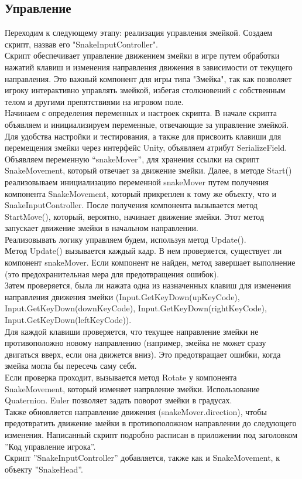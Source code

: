 \subsection{Управление}
Переходим к следующему этапу: реализация управления змейкой. 
Создаем скрипт, назвав его "SnakeInputController". \\
Скрипт обеспечивает управление движением змейки в игре путем обработки нажатий клавиш и изменения направления движения в зависимости от текущего направления. Это важный компонент для игры типа "Змейка", так как позволяет игроку интерактивно управлять змейкой, избегая столкновений с собственным телом и другими препятствиями на игровом поле.\\
Начинаем с определения переменных и настроек скрипта. В начале скрипта объявляем и инициализируем переменные, отвечающие за управление змейкой. Для удобства настройки и тестирования, а также для присвоить клавиши для перемещения змейки через интерфейс Unity, объявляем атрибут SerializeField. Объявляем переменную “snakeMover”, для хранения ссылки на скрипт SnakeMovement, который отвечает за движение змейки.
Далее, в методе Start() реализовываем инициализацию переменной snakeMover путем получения компонента SnakeMovement, который прикреплен к тому же объекту, что и SnakeInputController. После получения компонента вызывается метод StartMove(), который, вероятно, начинает движение змейки. Этот метод запускает движение змейки в начальном направлении.\\
Реализовывать логику управляем будем, используя метод Update(). \\
Метод Update() вызывается каждый кадр. В нем проверяется, существует ли компонент snakeMover. Если компонент не найден, метод завершает выполнение (это предохранительная мера для предотвращения ошибок).\\
Затем проверяется, была ли нажата одна из назначенных клавиш для изменения направления движения змейки (Input.GetKeyDown(upKeyCode), Input.GetKeyDown(downKeyCode), Input.GetKeyDown(rightKeyCode), Input.GetKeyDown(leftKeyCode)).\\
Для каждой клавиши проверяется, что текущее направление змейки не противоположно новому направлению (например, змейка не может сразу двигаться вверх, если она движется вниз). Это предотвращает ошибки, когда змейка могла бы пересечь саму себя.\\
Если проверка проходит, вызывается метод Rotate у компонента SnakeMovement, который изменяет напрвление змейки. Использование Quaternion. Euler позволяет задать поворот змейки в градусах.\\
Также обновляется направление движения (snakeMover.direction), чтобы предотвратить движение змейки в противоположном направлении до следующего изменения.
Написанный скрипт подробно расписан в приложении под заголовком
”Код управление игрока”.\\
Скрипт ”SnakeInputController” добавляется, также как и SnakeMovement, к объекту ”SnakeHead”. \\
